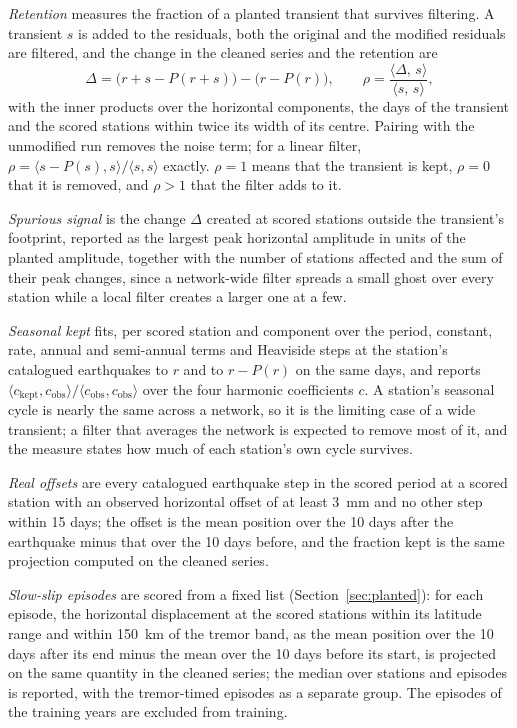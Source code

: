 \documentclass[preprint,12pt,authoryear]{elsarticle}
\begin{document}
\emph{Retention} measures the fraction of a planted transient that survives filtering. A transient $s$ is added to the residuals, both the original and the modified residuals are filtered, and the change in the cleaned series and the retention are
\begin{equation}
  \Delta = \big(r + s - P(r+s)\big) - \big(r - P(r)\big),
  \qquad
  \rho = \frac{\langle \Delta,\, s \rangle}{\langle s,\, s \rangle},
  \label{eq:retention}
\end{equation}
with the inner products over the horizontal components, the days of the transient and the scored stations within twice its width of its centre. Pairing with the unmodified run removes the noise term; for a linear filter, $\rho = \langle s - P(s), s\rangle / \langle s, s \rangle$ exactly. $\rho = 1$ means that the transient is kept, $\rho = 0$ that it is removed, and $\rho > 1$ that the filter adds to it.

\emph{Spurious signal} is the change $\Delta$ created at scored stations outside the transient's footprint, reported as the largest peak horizontal amplitude in units of the planted amplitude, together with the number of stations affected and the sum of their peak changes, since a network-wide filter spreads a small ghost over every station while a local filter creates a larger one at a few.

\emph{Seasonal kept} fits, per scored station and component over the period, constant, rate, annual and semi-annual terms and Heaviside steps at the station's catalogued earthquakes to $r$ and to $r - P(r)$ on the same days, and reports $\langle c_{\mathrm{kept}}, c_{\mathrm{obs}} \rangle / \langle c_{\mathrm{obs}}, c_{\mathrm{obs}} \rangle$ over the four harmonic coefficients $c$. A station's seasonal cycle is nearly the same across a network, so it is the limiting case of a wide transient; a filter that averages the network is expected to remove most of it, and the measure states how much of each station's own cycle survives.

\emph{Real offsets} are every catalogued earthquake step in the scored period at a scored station with an observed horizontal offset of at least 3~mm and no other step within 15 days; the offset is the mean position over the 10 days after the earthquake minus that over the 10 days before, and the fraction kept is the same projection computed on the cleaned series.

\emph{Slow-slip episodes} are scored from a fixed list (Section~\ref{sec:planted}): for each episode, the horizontal displacement at the scored stations within its latitude range and within 150~km of the tremor band, as the mean position over the 10 days after its end minus the mean over the 10 days before its start, is projected on the same quantity in the cleaned series; the median over stations and episodes is reported, with the tremor-timed episodes as a separate group. The episodes of the training years are excluded from training.
\end{document}
